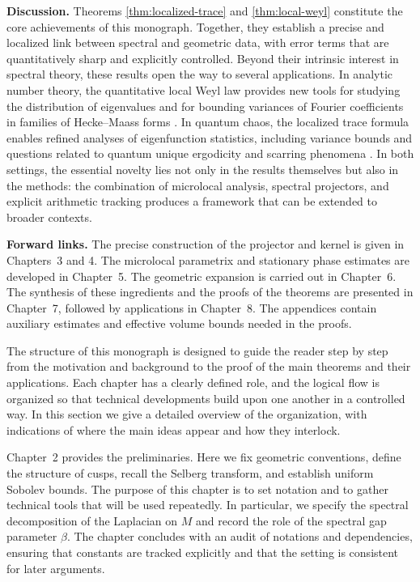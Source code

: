 \noindent \textbf{Discussion.}
Theorems \cref{thm:localized-trace} and \cref{thm:local-weyl} constitute the core
achievements of this monograph. Together, they establish a precise and
localized link between spectral and geometric data, with error terms that are
quantitatively sharp and explicitly controlled. Beyond their intrinsic interest
in spectral theory, these results open the way to several applications. In
analytic number theory, the quantitative local Weyl law provides new tools for
studying the distribution of eigenvalues and for bounding variances of Fourier
coefficients in families of Hecke–Maass forms
\cite{IwaniecSpectral,Sarnak2004,MichelVenkatesh2010}. In quantum chaos, the
localized trace formula enables refined analyses of eigenfunction statistics,
including variance bounds and questions related to quantum unique ergodicity
and scarring phenomena \cite{LindenstraussQUE,SoundararajanQUE}. In both
settings, the essential novelty lies not only in the results themselves but
also in the methods: the combination of microlocal analysis, spectral
projectors, and explicit arithmetic tracking produces a framework that can be
extended to broader contexts.

\medskip

\noindent \textbf{Forward links.}
The precise construction of the projector and kernel is given in Chapters~3 and
4. The microlocal parametrix and stationary phase estimates are developed in
Chapter~5. The geometric expansion is carried out in Chapter~6. The synthesis
of these ingredients and the proofs of the theorems are presented in Chapter~7,
followed by applications in Chapter~8. The appendices contain auxiliary
estimates and effective volume bounds needed in the proofs.

The structure of this monograph is designed to guide the reader step by step
from the motivation and background to the proof of the main theorems and their
applications. Each chapter has a clearly defined role, and the logical flow is
organized so that technical developments build upon one another in a controlled
way. In this section we give a detailed overview of the organization, with
indications of where the main ideas appear and how they interlock.

Chapter~2 provides the preliminaries. Here we fix geometric conventions, define
the structure of cusps, recall the Selberg transform, and establish uniform
Sobolev bounds. The purpose of this chapter is to set notation and to gather
technical tools that will be used repeatedly. In particular, we specify the
spectral decomposition of the Laplacian on $M$ and record the role of the
spectral gap parameter $\beta$. The chapter concludes with an audit of
notations and dependencies, ensuring that constants are tracked explicitly and
that the setting is consistent for later arguments.

